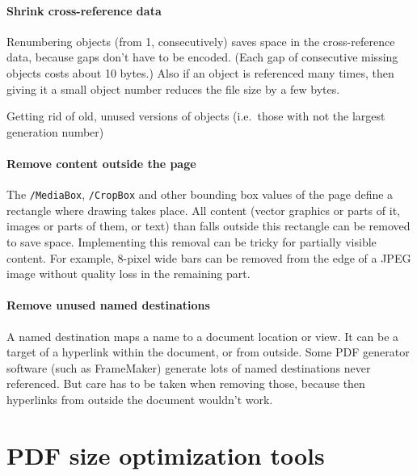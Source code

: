 \documentclass{ltugproc}
\begin{document}
\paragraph{Shrink cross-reference data}

Renumbering objects (from 1, consecutively) saves space in the
cross-reference data, because gaps don't have to be encoded. (Each gap of
consecutive missing objects costs about 10 bytes.) Also if an object is
referenced many times, then giving it a small object number reduces the file
size by a few bytes.

Getting rid of old, unused versions of objects (i.e.\ those with not the
largest generation number)

\paragraph{Remove content outside the page}

The \texttt{/MediaBox}, \texttt{/CropBox} and other bounding box values of
the page define a rectangle where drawing takes place. All content
(vector graphics or parts of it, images or parts of them, or text) than
falls outside this rectangle can be removed to save space. Implementing this
removal can be tricky for partially visible content. For example, 8-pixel
wide bars can be removed from the edge of a JPEG image without quality loss
in the remaining part.

\paragraph{Remove unused named destinations}

A named destination maps a name to a document location or view. It can be a
target of a hyperlink within the document, or from outside. Some PDF
generator software (such as FrameMaker) generate lots of named destinations
never referenced. But care has to be taken when removing those, because then
hyperlinks from outside the document wouldn't work.

\section{PDF size optimization tools}\label{tools}
\end{document}
